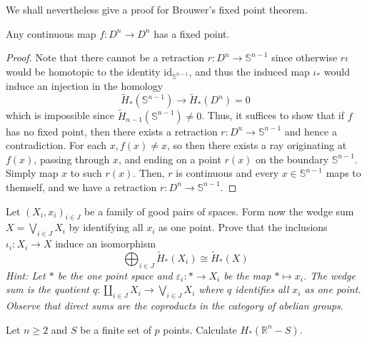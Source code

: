 \documentclass[12pt,reqno]{amsart}
\numberwithin{theorem}{section}
\theoremstyle{definition}
\theoremstyle{remark}
\numberwithin{equation}{section}
\renewcommand{\S}{\mathbb S}
\theoremstyle{definition}
\newcommand{\R}{\mathbb{R}}
\newcommand{\id}{\mathrm{id}}
\begin{document}
We shall nevertheless give a proof for Brouwer's fixed point theorem.
\begin{theorem}
    Any continuous map $f:D^n \rightarrow D^n$ has a fixed point.
\end{theorem}
\begin{proof}
    Note that there cannot be a retraction $r:D^n \rightarrow \S^{n-1}$ since otherwise $r\iota$ would be homotopic to the identity $\id_{\S^{n-1}}$, and thus the induced map $\iota_*$ would induce an injection in the homology 
    $$\tilde H_*(\S^{n-1})\rightarrow \tilde H_*(D^n) = 0$$
    which is impossible since $\tilde H_{n-1}(\S^{n-1}) \neq 0$. Thus, it suffices to show that if $f$ has no fixed point, then there exists a retraction $r:D^n \rightarrow \S^{n-1}$ and hence a contradiction. For each $x, f(x) \neq x$, so then there exists a ray originating at $f(x)$, passing through $x$, and ending on a point $r(x)$ on the boundary $\S^{n-1}$. Simply map $x$ to such $r(x)$. Then, $r$ is continuous and every $x \in \S^{n-1}$ maps to themself, and we have a retraction $r:D^n \rightarrow \S^{n-1}$.
\end{proof}
\begin{exercise}
    Let $(X_i,x_i)_{i \in J}$ be a family of good pairs of spaces. Form now the wedge sum $X=\bigvee_{i \in J}X_i$ by identifying all $x_i$ as one point. Prove that the inclusions $\iota_i:X_i\rightarrow X$ induce an isomorphism
    $$\bigoplus_{i \in J} \tilde H_*(X_i) \cong \tilde H_*(X)$$
    \textit{Hint: Let $*$ be the one point space and $\varepsilon_i:*\rightarrow X_i$ be the map $* \mapsto x_i$. The wedge sum is the quotient $q:\coprod_{i \in J}X_i \rightarrow \bigvee_{i \in J} X_i$ where $q$ identifies all $x_i$ as one point. Observe that direct sums are the coproducts in the category of abelian groups}.
\end{exercise}
\begin{exercise}
    Let $n \geq 2$ and $S$ be a finite set of $p$ points. Calculate $H_*(\R^n-S)$. 
\end{exercise}
\printbibliography
\end{document}
